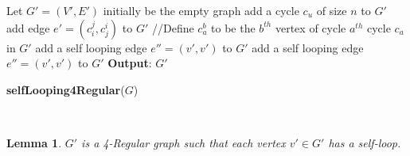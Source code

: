 \documentclass[psamsfonts, 10pt]{amsart}
\newtheorem{lem}[thm]{Lemma}
\theoremstyle{definition}
\theoremstyle{remark}
\numberwithin{equation}{section}
\newcommand{\creturn}{\mbox{}\\}
\begin{document}
\begin{algorithm}[H]
Let $G' = (V',E')$ initially be the empty graph\;
 {
add a cycle $c_u$ of size $n$ to $G'$\;
}
 {
add edge $e' = (c_i^j, c_j^i)$ to $G'$\;
\textsf{//Define $c_a^b$ to be the $b^{th}$ vertex of cycle $a^{th}$ cycle $c_a$ in $G'$}
}
 {
	 {
		add a self looping edge $e'' = (v', v')$ to $G'$\;
	}
	add a self looping edge $e'' = (v', v')$ to $G'$\;
}
{\bf Output}: $G'$\;

\caption{{\bf selfLooping4Regular}($G$)}
\end{algorithm}
\creturn
\begin{lem} $G'$ is a 4-Regular graph such that each vertex $v' \in G'$ has a self-loop.
 \end{lem}
\end{document}
